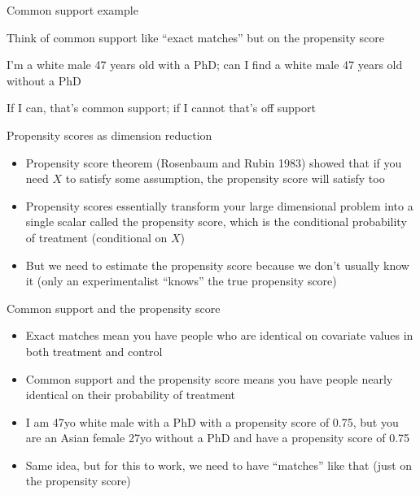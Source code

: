 \documentclass{beamer}
\begin{document}
\begin{frame}{Common support example}

Think of common support like ``exact matches'' but on the propensity score

\bigskip

I'm a white male 47 years old with a PhD; can I find a white male 47 years old without a PhD

\bigskip

If I can, that's common support; if I cannot that's off support

\end{frame}


\begin{frame}{Propensity scores as dimension reduction}

\begin{itemize}

\item Propensity score theorem (Rosenbaum and Rubin 1983) showed that if you need $X$ to satisfy some assumption, the propensity score will satisfy too
\item Propensity scores essentially transform your large dimensional problem into a single scalar called the propensity score, which is the conditional probability of treatment (conditional on $X$)
\item But we need to estimate the propensity score because we don't usually know it (only an experimentalist ``knows'' the true propensity score)

\end{itemize}

\end{frame}

\begin{frame}{Common support and the propensity score}

\begin{itemize}
\item Exact matches mean you have people who are identical on covariate values in both treatment and control
\item Common support and the propensity score means you have people nearly identical on their probability of treatment
\item I am 47yo white male with a PhD with a propensity score of 0.75, but you are an Asian female 27yo without a PhD and have a propensity score of 0.75
\item Same idea, but for this to work, we need to have ``matches'' like that (just on the propensity score)
\end{itemize}

\end{frame}
\end{document}
